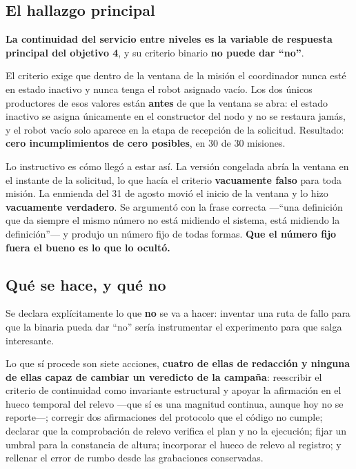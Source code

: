 \documentclass[12pt,letterpaper]{article}
\begin{document}
\subsection{El hallazgo principal}

\textbf{La continuidad del servicio entre niveles es la variable de respuesta principal del objetivo 4}, y su criterio binario \textbf{no puede dar ``no''}.

El criterio exige que dentro de la ventana de la misión el coordinador nunca esté en estado inactivo y nunca tenga el robot asignado vacío. Los dos únicos productores de esos valores están \textbf{antes} de que la ventana se abra: el estado inactivo se asigna únicamente en el constructor del nodo y no se restaura jamás, y el robot vacío solo aparece en la etapa de recepción de la solicitud. Resultado: \textbf{cero incumplimientos de cero posibles}, en 30 de 30 misiones.

Lo instructivo es cómo llegó a estar así. La versión congelada abría la ventana en el instante de la solicitud, lo que hacía el criterio \textbf{vacuamente falso} para toda misión. La enmienda del 31 de agosto movió el inicio de la ventana y lo hizo \textbf{vacuamente verdadero}. Se argumentó con la frase correcta ---``una definición que da siempre el mismo número no está midiendo el sistema, está midiendo la definición''--- y produjo un número fijo de todas formas. \textbf{Que el número fijo fuera el bueno es lo que lo ocultó.}

\subsection{Qué se hace, y qué no}

Se declara explícitamente lo que \textbf{no} se va a hacer: inventar una ruta de fallo para que la binaria pueda dar ``no'' sería instrumentar el experimento para que salga interesante.

Lo que sí procede son siete acciones, \textbf{cuatro de ellas de redacción y ninguna de ellas capaz de cambiar un veredicto de la campaña}: reescribir el criterio de continuidad como invariante estructural y apoyar la afirmación en el hueco temporal del relevo ---que sí es una magnitud continua, aunque hoy no se reporte---; corregir dos afirmaciones del protocolo que el código no cumple; declarar que la comprobación de relevo verifica el plan y no la ejecución; fijar un umbral para la constancia de altura; incorporar el hueco de relevo al registro; y rellenar el error de rumbo desde las grabaciones conservadas.
\end{document}
